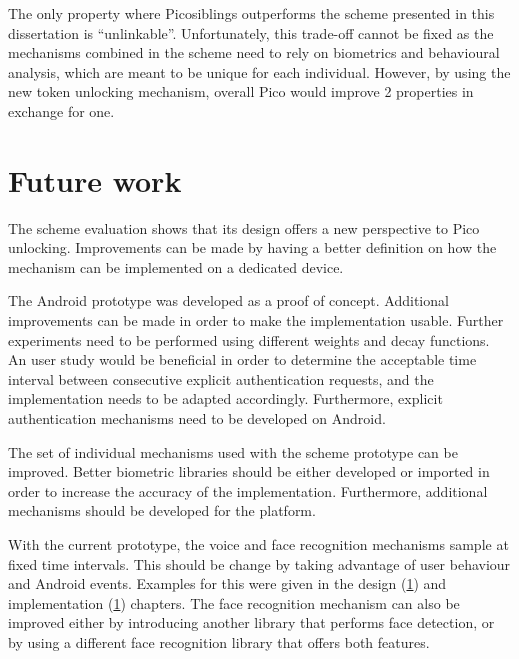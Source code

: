 The only property where Picosiblings outperforms the scheme presented in this dissertation is ``unlinkable''. Unfortunately, this trade-off cannot be fixed	as the mechanisms combined in the scheme need to rely on biometrics and behavioural analysis, which are meant to be unique for each individual. However, by using the new token unlocking mechanism, overall Pico would improve 2 properties in exchange for one.
	
\section{Future work}
The scheme evaluation shows that its design offers a new perspective to Pico unlocking. Improvements can be made by having a better definition on how the mechanism can be implemented on a dedicated device.

The Android prototype was developed as a proof of concept. Additional improvements can be made in order to make the implementation usable. Further experiments need to be performed using different weights and decay functions. An user study would be beneficial in order to determine the acceptable time interval between consecutive explicit authentication requests, and the implementation needs to be adapted accordingly. Furthermore, explicit authentication mechanisms need to be developed on Android.

The set of individual mechanisms used with the scheme prototype can be improved. Better biometric libraries should be either developed or imported in order to increase the accuracy of the implementation. Furthermore, additional mechanisms should be developed for the platform.

With the current prototype, the voice and face recognition mechanisms sample at fixed time intervals. This should be change by taking advantage of user behaviour and Android events. Examples for this were given in the design (\ref{}) and implementation (\ref{}) chapters. The face recognition mechanism can also be improved either by introducing another library that performs face detection, or by using a different face recognition library that offers both features.


